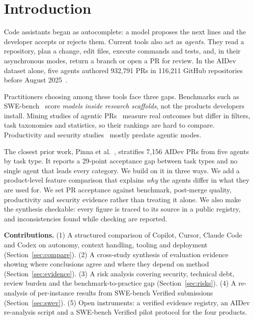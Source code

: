 \documentclass[conference]{IEEEtran}
\begin{document}
\section{Introduction}

Code assistants began as autocomplete: a model proposes the next lines and the developer accepts or
rejects them. Current tools also act as \emph{agents}. They read a repository, plan a change, edit files,
execute commands and tests, and, in their asynchronous modes, return a branch or open a PR for review. In
the AIDev dataset alone, five agents authored 932,791 PRs in 116,211 GitHub repositories before August
2025~\cite{li2026aidev}.

Practitioners choosing among these tools face three gaps. Benchmarks such as SWE-bench~\cite{jimenez2024swebench}
score \emph{models inside research scaffolds}, not the products developers install. Mining studies of
agentic PRs~\cite{li2025teammates,rahman2026,mazloomzadeh2026,pinna2026} measure real outcomes but differ
in filters, task taxonomies and statistics, so their rankings are hard to compare. Productivity and
security studies~\cite{peng2023copilot,cui2025effects,perry2023insecure} mostly predate agentic modes.

The closest prior work, Pinna et al.~\cite{pinna2026}, stratifies 7,156 AIDev PRs from five agents by task
type. It reports a 29-point acceptance gap between task types and no single agent that leads every
category. We build on it in three ways. We add a product-level feature comparison that explains
\emph{why} the agents differ in what they are used for. We set PR acceptance against benchmark,
post-merge quality, productivity and security evidence rather than treating it alone. We also make the
synthesis checkable: every figure is traced to its source in a public registry, and inconsistencies found
while checking are reported.

\textbf{Contributions.}
(1) A structured comparison of Copilot, Cursor, Claude Code and Codex on autonomy, context handling,
tooling and deployment (Section~\ref{sec:compare}).
(2) A cross-study synthesis of evaluation evidence showing where conclusions agree and where they depend on
method (Section~\ref{sec:evidence}).
(3) A risk analysis covering security, technical debt, review burden and the benchmark-to-practice gap
(Section~\ref{sec:risks}).
(4) A re-analysis of per-instance results from \swevSubs{} SWE-bench Verified submissions
(Section~\ref{sec:swev}).
(5) Open instruments: a verified evidence registry, an AIDev re-analysis script and a SWE-bench Verified
pilot protocol for the four products.
\end{document}
